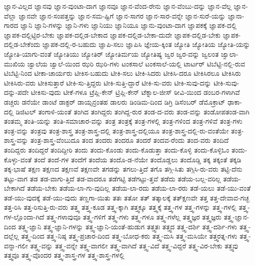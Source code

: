 {ಜ್ಞಾನ-ವಿಲ್ಲದ
ಜ್ಞಾನವು
ಜ್ಞಾನ-ವುಂಟಾ-ದಾಗ
ಜ್ಞಾನವೂ
ಜ್ಞಾನ-ವೆಂದ-ರೇನು
ಜ್ಞಾನ-ವೆಂಬು-ದನ್ನು
ಜ್ಞಾನ-ವೆಲ್ಲ
ಜ್ಞಾನ-ವೆಲ್ಲಾ
ಜ್ಞಾನವೇ
ಜ್ಞಾನ-ಸಂಪತ್ತನ್ನು
ಜ್ಞಾನ-ಸಮ-ಷ್ಟಿಗೆ
ಜ್ಞಾನ-ಸಾಗರ
ಜ್ಞಾನ-ಸಾರ-ವನ್ನೇ
ಜ್ಞಾನ-ಸುರೆ-ಯನ್ನು
ಜ್ಞಾನಾ-ಗಾರದ
ಜ್ಞಾನಿ
ಜ್ಞಾನಿ-ಗಳನ್ನು
ಜ್ಞಾನಿ-ಗಳು
ಜ್ಞಾನಿಯು
ಜ್ಞಾನಿಯೂ
ಜ್ಞಾನು-ವುಂಟಾ-ದಾಗ
ಜ್ಞಾಪಕಕ್ಕೆ
ಜ್ಞಾಪಕ-ದಲ್ಲಿ
ಜ್ಞಾಪಕ-ದಲ್ಲಿಟ್ಟಿರ-ಬೇಕು
ಜ್ಞಾಪಕ-ದಲ್ಲಿಡ-ಬೇಕಾದ
ಜ್ಞಾಪಕ-ದಲ್ಲಿಡ-ಬೇಕಾ-ದುದೇ
ಜ್ಞಾಪಕ-ದಲ್ಲಿಡ-ಬೇಕು
ಜ್ಞಾಪಕ-ದಲ್ಲಿಡ-ಬೇಕೆಂದು
ಜ್ಞಾಪಕ-ದಲ್ಲಿ-ರ-ಬಹುದು
ಜ್ಞಾಪಿ-ಸಲು
ಜ್ಞಾಪಿಸಿ
ಜ್ಞೇಯ-ಕ್ಕಿಂತ
ಜ್ಯೋತಿ
ಜ್ಯೋತಿಯ
ಜ್ಯೋತಿ-ಯನ್ನು
ಜ್ಯೋತಿ-ಯಾಗು-ವಂತೆ
ಜ್ಯೋತಿಯು
ಜ್ಯೋತಿರ್
ಜ್ಯೋತಿರ್ಮಯ
ಜ್ಯೋತಿಷ್ಯ
ಜ್ವರ
ಜ್ವರ-ವನ್ನು
ಜ್ವಲಂತ
ಜ್ವಾಲಾ-ಮುಖಿಯ
ಜ್ವಾಲೆಯ
ಜ್ವಾಲೆ-ಯಿಂದ
ಝರಿ
ಝರಿ-ಗಳು
ಟಂಕಸಾಲೆ
ಟಂಕಸಾಲೆ-ಯಲ್ಲಿ
ಟಾರ್ಟರ್
ಟಿಬೆಟ್ಟಿ-ನಲ್ಲಿ-ರುವ
ಟಿಬೆಟ್ಟಿ-ನಿಂದ
ಟೀಕಾ-ಚಾರ್ಯರು
ಟೀಕಿಸ-ಬಹುದು
ಟೀಕಿ-ಸಲು
ಟೀಕಿ-ಸಿದರು
ಟೀಕಿಸಿ-ದರೂ
ಟೀಕಿಸಿರಲೂ
ಟೀಕಿಸಿರು
ಟೀಕಿಸಿರು-ವರು
ಟೀಕಿಸುತ್ತಾರೆ
ಟೀಕಿ-ಸು-ತ್ತಿದ್ದರು
ಟೀಕಿ-ಸುತ್ತಿ-ದ್ದಾರೆ
ಟೀಕಿ-ಸು-ವರು
ಟೀಕಿ-ಸುವು-ದನ್ನು
ಟೀಕಿ-ಸುವು-ದನ್ನು-ಪದೇ
ಟೀಕಿಸು-ವುದು
ಟೀಕೆ-ಗಳೂ
ಟ್ರೆಪ್ಲಿ-ಕೇನ್
ಟ್ರಿಪ್ಲಿ-ಕೇನ್
ಟೆಕ್ನಾಲ-ಜೀಸ್
ಠೀವಿ-ಯಿಂದ
ಡಂಬರ-ಗಳಾಗಿವೆ
ಡಚ್ಚರು
ಡನೆಯೇ
ಡಾಂಟೆ
ಡಾಕ್ಟರ್
ಡಾಯ್ಸನ್ರಂತಹ
ಡಾಲರು
ಡಿಂಡಿಮ-ದಿಂದ
ಡಿಗ್ರಿ
ಡಿಸೆಂಬರ್
ಡೆಮೊಕ್ರಾಟ್
ಢಾಕಾ-ದಲ್ಲಿ
ಡಿಜಿಟಲ್
ತಂಗಾಳಿ-ಯಂತೆ
ತಂಗಿದ
ತಂಗಿದ್ದರು
ತಂಗಿದ್ದ-ರುರ
ತಂಡ-ದ-ವರು
ತಂಡ-ವನ್ನು
ತಂಡೋಪತಂಡ-ವಾಗಿ
ತಂತಮ್ಮ
ತಂತಿ-ಯನ್ನು
ತಂತಿ-ಸಮಾಚಾರ-ವನ್ನು
ತಂತ್ರ
ತಂತ್ರಕ್ಕೆ
ತಂತ್ರ-ಗಳಲ್ಲಿ
ತಂತ್ರ-ಗಳಿಂದ
ತಂತ್ರ-ಗಳಿವೆ
ತಂತ್ರ-ಗಳು
ತಂತ್ರ-ವನ್ನು
ತಂತ್ರವು
ತಂತ್ರ-ಶಾಸ್ತ್ರ
ತಂತ್ರ-ಶಾಸ್ತ್ರ-ದಲ್ಲಿ
ತಂತ್ರ-ಶಾಸ್ತ್ರ-ದಲ್ಲಿಯೂ
ತಂತ್ರ-ಶಾಸ್ತ್ರ-ದಲ್ಲಿ-ರು-ವಂತೆಯೇ
ತಂತ್ರ-ಶಾಸ್ತ್ರ-ವನ್ನು
ತಂತ್ರ-ಶಾಸ್ತ್ರ-ವೆಂಬುದೂ
ತಂದ
ತಂದರು
ತಂದರೂ
ತಂದರೆ
ತಂದವ-ರೆಂದು
ತಂದ-ವರು
ತಂದಿದೆ
ತಂದಿದ್ದರು
ತಂದಿದ್ದರೆ
ತಂದಿದ್ದೀರಿ
ತಂದು
ತಂದು-ಕೊಂಡು
ತಂದು-ಕೊಡುತ್ತಾ
ತಂದು-ಕೊಳ್ಳಿ
ತಂದು-ಕೊಳ್ಳಿಓಂ
ತಂದು-ಕೊಳ್ಳು-ವಂತೆ
ತಂದೆ
ತಂದೆ-ಗಳ
ತಂದೆಗೆ
ತಂದೆಯ
ತಂದೊ-ಡ-ನೆಯೇ
ತಂದೊಡ್ಡಲು
ತಂದೊಡ್ಡಿ
ತಕ್ಕ
ತಕ್ಕಂತೆ
ತಕ್ಕಡಿ
ತಕ್ಕ-ಭಾಷೆ
ತಕ್ಷಣ
ತಕ್ಷಣದ
ತಕ್ಷಣವೆ
ತಕ್ಷಣವೇ
ತಗಡನ್ನು
ತಗಲು-ತ್ತಿದೆ
ತಗೊ
ತಗ್ಗಿ-ಸಿತು
ತಗ್ಗಿಸಿ-ರು-ವರು
ತಟ್ಟಿ-ದೆನು
ತಟ್ಟು-ವಾಗ
ತಡ
ತಡ-ವಾಗು-ತ್ತಿದೆ
ತಡ-ವಾದರೂ
ತಡೆಗಟ್ಟಿ
ತಡೆಗಟ್ಟು-ತ್ತವೆ
ತಡೆದು
ತಡೆಯ-ಬಲ್ಲ-ವರಿಲ್ಲ
ತಡೆಯ-ಬೇಕಾಗಿದೆ
ತಡೆಯ-ಬೇಕು
ತಡೆಯ-ಲಾ-ಗು-ವುದಿಲ್ಲ
ತಡೆಯ-ಲಾ-ರದು
ತಡೆಯ-ಲಾ-ರರು
ತಡೆ-ಯಲು
ತಡೆ-ಯು-ವಂತೆ
ತಡೆ-ಯು-ವುದಕ್ಕೆ
ತಡೆ-ಯು-ವುದು
ತಣ್ಣಗಾ-ಯಿತು
ತತಃ
ತತೋ
ತತ್
ತತ್ಕಾಲಕ್ಕೆ
ತತ್ಕ್ಷಣವೇ
ತತ್ತ
ತತ್ತ-ದೇವಾವ-ಗಚ್ಛ
ತತ್ತ-ರಿಸಿ
ತತ್ತ-ರಿಸುತ್ತಿ-ರು-ವರು
ತತ್ತ್ವ
ತತ್ತ್ವ-ಕೂಡ
ತತ್ತ್ವ-ಕ್ಕಾಗಿ
ತತ್ತ್ವಕ್ಕೂ
ತತ್ತ್ವಕ್ಕೆ
ತತ್ತ್ವ-ಗಳ
ತತ್ತ್ವ-ಗಳನ್ನು
ತತ್ತ್ವ-ಗಳಲ್ಲಿ
ತತ್ತ್ವ-ಗಳ-ಲ್ಲೊಂದಾ-ಗಿದೆ
ತತ್ತ್ವ-ಗಳಾವುವೂ
ತತ್ತ್ವ-ಗಳಿಗೆ
ತತ್ತ್ವ-ಗಳು
ತತ್ತ್ವ-ಗಳೂ
ತತ್ತ್ವ-ಗಳೆಲ್ಲ
ತತ್ತ್ವಜ್ಞರ
ತತ್ತ್ವಜ್ಞರು
ತತ್ತ್ವ-ಜ್ಞಾನ-ದಿಂದ
ತತ್ತ್ವ-ಜ್ಞಾನಿ
ತತ್ತ್ವ-ಜ್ಞಾನಿ-ಗಳನ್ನು
ತತ್ತ್ವ-ಜ್ಞಾನಿ-ಯಂತೆ-ಹುಡುಗ
ತತ್ತ್ವತಃ
ತತ್ತ್ವದ
ತತ್ತ್ವ-ದರ್ಶಿ
ತತ್ತ್ವ-ದರ್ಶಿ-ಗಳು
ತತ್ತ್ವ-ದಲ್ಲೆಲ್ಲ
ತತ್ತ್ವ-ದಿಂದ
ತತ್ತ್ವ-ನಿಷ್ಠ
ತತ್ತ್ವ-ಪ್ರಚಾರ-ದಿಂದ
ತತ್ತ್ವ-ಬೋಧ-ಕರು
ತತ್ತ್ವ-ಮಸಿ
ತತ್ತ್ವ-ಮಸಿಯೇ
ತತ್ತ್ವರತ್ನ-ಗಳು
ತತ್ತ್ವ-ವನ್ನಾ-ಗಲೀ
ತತ್ತ್ವ-ವನ್ನು
ತತ್ತ್ವ-ವನ್ನೇ
ತತ್ತ್ವ-ವಾಗಲೀ
ತತ್ತ್ವ-ವಾಗಿದೆ
ತತ್ತ್ವ-ವಿದೆ
ತತ್ತ್ವ-ವಿದ್ದರೆ
ತತ್ತ್ವ-ವಿರ-ಬೇಕು
ತತ್ತ್ವವು
ತತ್ತ್ವವೂ
ತತ್ತ್ವ-ವೊಂದರ
ತತ್ತ್ವ-ಶಾಸ್ತ್ರ-ಗಳ
ತತ್ತ್ವ-ಶಾಸ್ತ್ರ-ಗಳಲ್ಲಿ
}

